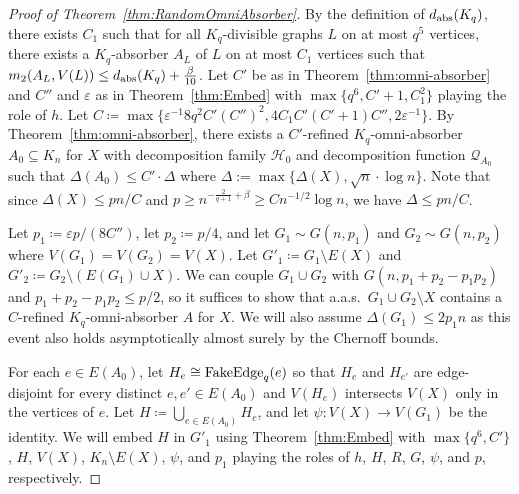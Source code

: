 \documentclass[11pt]{article}
\numberwithin{equation}{section}
\newcommand{\eps}{\varepsilon}
\newcounter{i}
\theoremstyle{plain}
\theoremstyle{plain} %
\theoremstyle{definition}
\newcommand{\aas}{a.a.s.\ }
\begin{document}
\begin{proof}[Proof of Theorem~\ref{thm:RandomOmniAbsorber}]
By the definition of $d_{{\rm abs}}(K_q)$, there exists $C_1$ such that for all $K_q$-divisible graphs $L$ on at most $q^5$ vertices, there exists a $K_q$-absorber $A_L$ of $L$ on at most $C_1$ vertices such that $m_2(A_L,V(L))\le d_{{\rm abs}}(K_q)+\frac{\beta}{10}$. 
Let $C'$ be as in Theorem~\ref{thm:omni-absorber} and $C''$ and $\eps$ as in Theorem~\ref{thm:Embed} with $\max\{q^6, C' + 1, C_1^2\}$ playing the role of $h$. Let $C \coloneqq \max\{\eps^{-1}8q^2 C' (C'')^2, 4C_1C'(C'+1)C'', 2\eps^{-1}\}$. By Theorem~\ref{thm:omni-absorber}, there exists a $C'$-refined $K_q$-omni-absorber $A_0\subseteq K_n$ for $X$ with decomposition family $\mathcal{H}_0$ and decomposition function $\mathcal{Q}_{A_0}$ such that $\Delta(A_0)\le C'\cdot \Delta$ where $\Delta := \max\{\Delta(X), \sqrt{n}\cdot \log n\}$.  Note that since $\Delta(X) \leq pn / C$ and $p \geq n^{-\frac{2}{q + 1} + \beta} \geq Cn^{-1/2}\log n$, we have $\Delta \leq pn / C$.


Let $p_1 \coloneqq  \eps p / (8C'')$, let $p_2 \coloneqq p/4$, and let $G_1 \sim G(n,p_1)$ and $G_2\sim G(n,p_2)$ where $V(G_1) = V(G_2) = V(X)$.  Let $G'_1 \coloneqq G_1\setminus E(X)$ and $G'_2 \coloneqq G_2 \setminus (E(G_1) \cup X)$.  We can couple $G_1 \cup G_2$ with $G(n,p_1 + p_2 - p_1p_2)$ and $p_1 + p_2 - p_1p_2 \leq p / 2$, so it suffices to show that \aas $G_1 \cup G_2 \setminus X$ contains a $C$-refined $K_q$-omni-absorber $A$ for $X$. %
We will also assume $\Delta(G_1) \leq 2p_1n$ as this event also holds asymptotically almost surely by the Chernoff bounds.


For each $e \in E(A_0)$, let $H_e \cong {\rm FakeEdge}_q(e)$ so that $H_e$ and $H_{e'}$ are edge-disjoint for every distinct $e,e' \in E(A_0)$ and $V(H_e)$ intersects $V(X)$ only in the vertices of $e$.  Let $H \coloneqq \bigcup_{e\in E(A_0)}H_e$, and let $\psi : V(X) \rightarrow V(G_1)$ be the identity. 
We will embed $H$ in $G'_1$ using Theorem~\ref{thm:Embed} with  $\max\{q^{6}, C'\}$, $H$, $V(X)$, $K_n \setminus E(X)$, $\psi$, and $p_1$ playing the roles of $h$, $H$, $R$, $G$, $\psi$, and $p$, respectively.


\end{proof}
\end{document}
